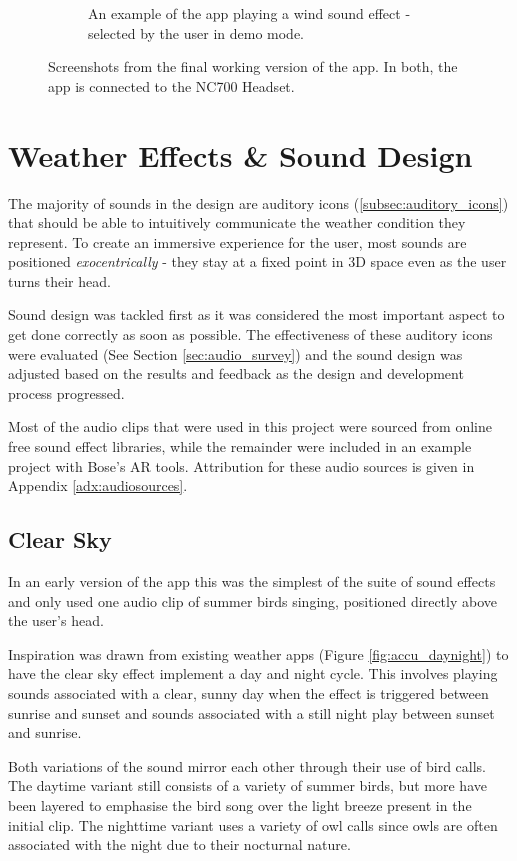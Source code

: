 \documentclass{l4proj}
\begin{document}
\begin{figure}[htb!]
\begin{subfigure}[b]{0.35\textwidth}
        \caption{An example of the app playing a wind sound effect - selected by the user in demo mode.}
        \label{fig:syn2}
    \end{subfigure}
    \caption{Screenshots from the final working version of the app. In both, the app is connected to the NC700 Headset.
    }\label{fig:screenshots}
\end{figure}

\section{Weather Effects \& Sound Design}

The majority of sounds in the design are auditory icons (\ref{subsec:auditory_icons}) that should be able to intuitively communicate the weather condition they represent. To create an immersive experience for the user, most sounds are positioned \emph{exocentrically} - they stay at a fixed point in 3D space even as the user turns their head. 

Sound design was tackled first as it was considered the most important aspect to get done correctly as soon as possible. The effectiveness of these auditory icons were evaluated (See Section \ref{sec:audio_survey}) and the sound design was adjusted based on the results and feedback as the design and development process progressed. 

Most of the audio clips that were used in this project were sourced from online free sound effect libraries, while the remainder were included in an example project with Bose's AR tools. Attribution for these audio sources is given in Appendix \ref{adx:audiosources}.

\subsection{Clear Sky}
In an early version of the app this was the simplest of the suite of sound effects and only used one audio clip of summer birds singing, positioned directly above the user's head.

Inspiration was drawn from existing weather apps (Figure \ref{fig:accu_daynight}) to have the clear sky effect implement a day and night cycle. This involves playing sounds associated with a clear, sunny day when the effect is triggered between sunrise and sunset and sounds associated with a still night play between sunset and sunrise.

Both variations of the sound mirror each other through their use of bird calls. The daytime variant still consists of a variety of summer birds, but more have been layered to emphasise the bird song over the light breeze present in the initial clip. The nighttime variant uses a variety of owl calls since owls are often associated with the night due to their nocturnal nature.
\end{document}
